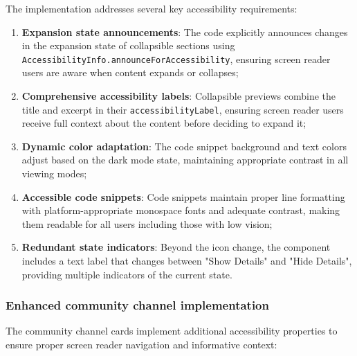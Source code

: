 The implementation addresses several key accessibility requirements:

\begin{enumerate}
    \item \textbf{Expansion state announcements}: The code explicitly announces changes in the expansion state of collapsible sections using \texttt{AccessibilityInfo.announceForAccessibility}, ensuring screen reader users are aware when content expands or collapses;
    
    \item \textbf{Comprehensive accessibility labels}: Collapsible previews combine the title and excerpt in their \texttt{accessibilityLabel}, ensuring screen reader users receive full context about the content before deciding to expand it;
    
    \item \textbf{Dynamic color adaptation}: The code snippet background and text colors adjust based on the dark mode state, maintaining appropriate contrast in all viewing modes;
    
    \item \textbf{Accessible code snippets}: Code snippets maintain proper line formatting with platform-appropriate monospace fonts and adequate contrast, making them readable for all users including those with low vision;
    
    \item \textbf{Redundant state indicators}: Beyond the icon change, the component includes a text label that changes between "Show Details" and "Hide Details", providing multiple indicators of the current state.
\end{enumerate}

\subsubsection{Enhanced community channel implementation}
\label{subsubsec:instruction-channel-implementation}

The community channel cards implement additional accessibility properties to ensure proper screen reader navigation and informative context:

